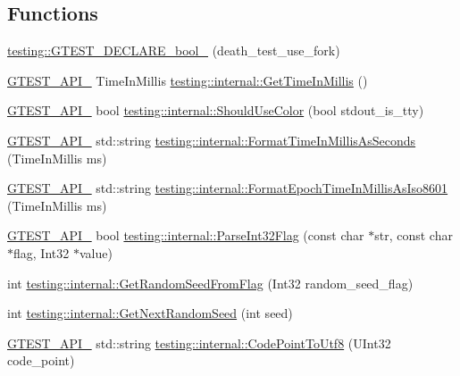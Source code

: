 \subsection*{Functions}
\begin{DoxyCompactItemize}
\item 
\hyperlink{namespacetesting_a534f0743e7c42c55d27dcd0dd3d38f18}{testing\+::\+G\+T\+E\+S\+T\+\_\+\+D\+E\+C\+L\+A\+R\+E\+\_\+bool\+\_\+} (death\+\_\+test\+\_\+use\+\_\+fork)
\item 
\hyperlink{gtest-port_8h_aa73be6f0ba4a7456180a94904ce17790}{G\+T\+E\+S\+T\+\_\+\+A\+P\+I\+\_\+} Time\+In\+Millis \hyperlink{namespacetesting_1_1internal_ae66b46943a429e6efb1db456d4cae90c}{testing\+::internal\+::\+Get\+Time\+In\+Millis} ()
\item 
\hyperlink{gtest-port_8h_aa73be6f0ba4a7456180a94904ce17790}{G\+T\+E\+S\+T\+\_\+\+A\+P\+I\+\_\+} bool \hyperlink{namespacetesting_1_1internal_ac1db1b4603967a6c4404f31cbbac31a6}{testing\+::internal\+::\+Should\+Use\+Color} (bool stdout\+\_\+is\+\_\+tty)
\item 
\hyperlink{gtest-port_8h_aa73be6f0ba4a7456180a94904ce17790}{G\+T\+E\+S\+T\+\_\+\+A\+P\+I\+\_\+} std\+::string \hyperlink{namespacetesting_1_1internal_a904485f27a54be8a5a92856e2d838797}{testing\+::internal\+::\+Format\+Time\+In\+Millis\+As\+Seconds} (Time\+In\+Millis ms)
\item 
\hyperlink{gtest-port_8h_aa73be6f0ba4a7456180a94904ce17790}{G\+T\+E\+S\+T\+\_\+\+A\+P\+I\+\_\+} std\+::string \hyperlink{namespacetesting_1_1internal_a5ef227c4a610e7ff638b12dfb25b068e}{testing\+::internal\+::\+Format\+Epoch\+Time\+In\+Millis\+As\+Iso8601} (Time\+In\+Millis ms)
\item 
\hyperlink{gtest-port_8h_aa73be6f0ba4a7456180a94904ce17790}{G\+T\+E\+S\+T\+\_\+\+A\+P\+I\+\_\+} bool \hyperlink{namespacetesting_1_1internal_ae3449e173767750b613114ceac6d916a}{testing\+::internal\+::\+Parse\+Int32\+Flag} (const char $\ast$str, const char $\ast$flag, Int32 $\ast$value)
\item 
int \hyperlink{namespacetesting_1_1internal_ae74fedbdaebaac8d1202192266243b9e}{testing\+::internal\+::\+Get\+Random\+Seed\+From\+Flag} (Int32 random\+\_\+seed\+\_\+flag)
\item 
int \hyperlink{namespacetesting_1_1internal_a6e07a655cb987d131cd8fbeba9a7f1eb}{testing\+::internal\+::\+Get\+Next\+Random\+Seed} (int seed)
\item 
\hyperlink{gtest-port_8h_aa73be6f0ba4a7456180a94904ce17790}{G\+T\+E\+S\+T\+\_\+\+A\+P\+I\+\_\+} std\+::string \hyperlink{namespacetesting_1_1internal_a0c0f9558efb9abb965851c4738cdc725}{testing\+::internal\+::\+Code\+Point\+To\+Utf8} (U\+Int32 code\+\_\+point)

\end{DoxyCompactItemize}
